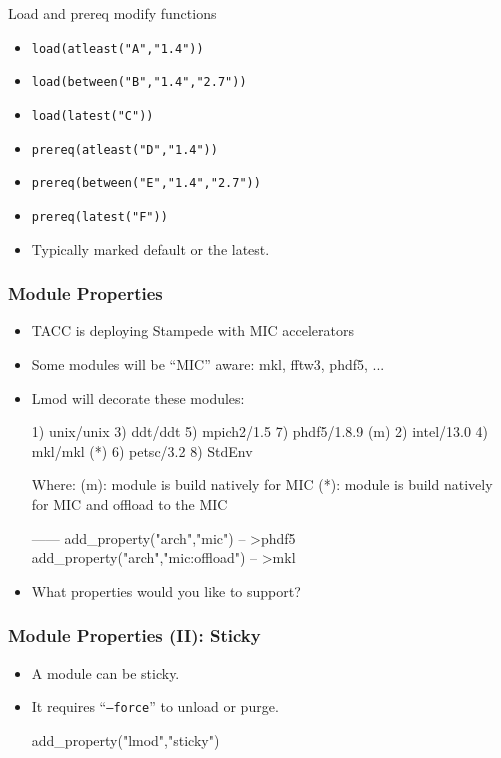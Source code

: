 \documentclass{beamer}
\begin{document}
\begin{frame}{Load and prereq modify functions}
  \begin{itemize}
    \item \texttt{load(atleast("A","1.4"))}
    \item \texttt{load(between("B","1.4","2.7"))}
    \item \texttt{load(latest("C"))}
    \item \texttt{prereq(atleast("D","1.4"))}
    \item \texttt{prereq(between("E","1.4","2.7"))}
    \item \texttt{prereq(latest("F"))}
    \item Typically marked default or the latest.
  \end{itemize}
\end{frame}

\begin{frame}[fragile]
    \frametitle{Module Properties}
  \begin{itemize}
    \item TACC is deploying Stampede with MIC accelerators
    \item Some modules will be ``MIC'' aware: mkl, fftw3, phdf5, ...
    \item Lmod will decorate these modules:
  {\tiny
    \begin{semiverbatim}
  1) unix/unix     3) ddt/ddt       5) mpich2/1.5    7) phdf5/1.8.9 {\color{blue}(m)}
  2) intel/13.0    4) mkl/mkl {\color{red}(*)}   6) petsc/3.2     8) StdEnv

  Where:
   {\color{blue}(m)}:  module is build natively for MIC
   {\color{red}(*)}:  module is build natively for MIC and offload to the MIC

   ------
   add_property("arch","mic")              -- \textgreater phdf5
   add_property("arch","mic:offload")      -- \textgreater mkl
    \end{semiverbatim}
}
  \item What properties would you like to support?
  \end{itemize}
\end{frame}


\begin{frame}[fragile]
    \frametitle{Module Properties (II): Sticky}
  \begin{itemize}
    \item A module can be sticky.
    \item It requires ``\texttt{--force}'' to unload or purge.
    {\small
\begin{semiverbatim}
    add\_property("lmod","sticky")
\end{semiverbatim}
}
  \end{itemize}
\end{frame}
\end{document}
